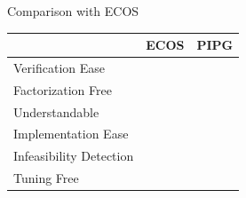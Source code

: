 \documentclass[aspectratio=169]{beamer}
\newcommand{\cmark}{\textcolor{green}{\text{\ding{51}}}}
\newcommand{\xmark}{\textcolor{red}{\text{\ding{55}}}}
\begin{document}
\begin{frame}{Comparison with ECOS}
    \begin{center}
        \begin{tabular}{ |p{4cm}||p{1cm}|p{1cm}|}
            \hline
              & ECOS & PIPG \\
            \hline
            Verification Ease   & \xmark    &\cmark\\
            Factorization Free&   \xmark  & \cmark\\
            Understandable &   \xmark  & \cmark\\
            Implementation Ease&   \xmark  & \cmark\\
            Infeasibility Detection&   \cmark  & \cmark\\
            Tuning Free&   \cmark  & \xmark\\
            \hline
        \end{tabular}       
    \end{center}
\end{frame}
\end{document}
